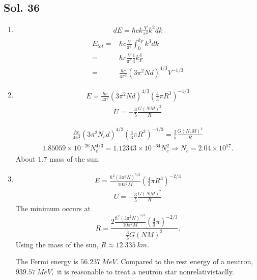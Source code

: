    \subsection*{Sol. 36}
   \begin{enumerate}
       \item 
       \begin{align*}
           dE = \hbar ck\frac{V}{\pi^2}k^2 dk
       \end{align*}
       \begin{align*}
           E_{tot} = &
           \hbar c\frac{V}{\pi^2}\int_0^{k_F} 
           k^3dk\\
           =&
           \hbar c\frac{V}{\pi^2}\frac{1}{4}k_F^4\\
           =&\frac{\hbar c}{4\pi^2}(3\pi^2Nd)^{4/3}V^{-1/3}
       \end{align*}
       \item 
       \begin{align*}
           E = \frac{\hbar c}{4\pi^2}(3\pi^2Nd)^{4/3}(\frac{4}{3}\pi R^3)^{-1/3}
       \end{align*}
       \begin{align*}
           U = -\frac{3}{5}\frac{G(NM)^2}{R}
       \end{align*}

       \begin{align*}
           \frac{\hbar c}{4\pi^2}(3\pi^2N_cd)^{4/3}(\frac{4}{3}\pi R^3)^{-1/3}
           =\frac{3}{5}\frac{G(N_cM)^2}{R}
       \end{align*}
       \begin{align*}
           1.85059\times 10^{-26}N_c^{4/3} = 1.12343\times 10^{-64}N_c^{2}
           \Rightarrow 
           N_c = 2.04\times 10^{57}. 
       \end{align*}
       About $1.7$ mass of the sun.
       \item 
       \begin{align*}
           E = \frac{\hbar^2(3\pi^2 N)^{5/3}}{10\pi^2 M}(\frac{4}{3}\pi R^3)^{-2/3}
       \end{align*}
       \begin{align*}
           U = -\frac{3}{5}\frac{G(NM)^2}{R}
       \end{align*}
       The minimum occurs at 
       $$
       R = \frac{2\frac{\hbar^2(3\pi^2 N)^{5/3}}{10\pi^2 M}(\frac{4}{3}\pi )^{-2/3}}
       {\frac{3}{5}G(NM)^2}.
       $$ Using the mass of the sun, $R\approx \qty{12.335}{km}.$

       The Fermi energy is $\qty{56.237}{MeV}.$ Compared to the rest energy of a neutron, $\qty{939.57}{MeV},$ it is reasonable to treat a neutron star nonrelativistaclly.
   \end{enumerate}
